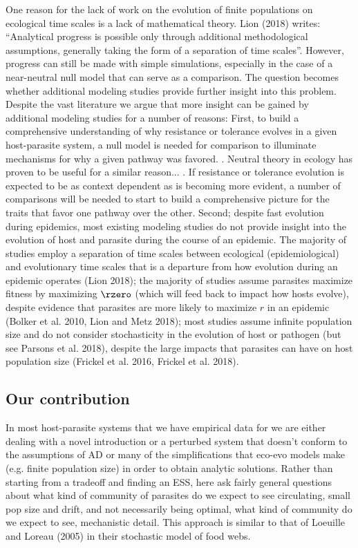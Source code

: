  One reason for the lack of work on the evolution of finite populations on ecological time scales is a lack of mathematical theory. Lion (2018) writes: ``Analytical progress is possible only through additional methodological assumptions, generally taking the form of a separation of time scales''. However, progress can still be made with simple simulations, especially in the case of a near-neutral null model that can serve as a comparison. The question becomes whether additional modeling studies provide further insight into this problem. Despite the vast literature we argue that more insight can be gained by additional modeling studies for a number of reasons: First, to build a comprehensive understanding of why resistance or tolerance evolves in a given host-parasite system, a null model is needed for comparison to illuminate mechanisms for why a given pathway was favored. . Neutral theory in ecology has proven to be useful for a similar reason... . If resistance or tolerance evolution is expected to be as context dependent as is becoming more evident, a number of comparisons will be needed to start to build a comprehensive picture for the traits that favor one pathway over the other. Second; despite fast evolution during epidemics, most existing modeling studies do not provide insight into the evolution of host and parasite during the course of an epidemic. The majority of studies employ a separation of time scales between ecological (epidemiological) and evolutionary time scales that is a departure from how evolution during an epidemic operates (Lion 2018); the majority of studies assume parasites maximize fitness by maximizing $\rzero$ (which will feed back to impact how hosts evolve), despite evidence that parasites are more likely to maximize $r$ in an epidemic (Bolker et al. 2010, Lion and Metz 2018); most studies assume infinite population size and do not consider stochasticity in the evolution of host or pathogen (but see Parsons et al. 2018), despite the large impacts that parasites can have on host population size (Frickel et al. 2016, Frickel et al. 2018).

\subsection*{Our contribution}

In most host-parasite systems that we have empirical data for we are either dealing with a novel introduction or a perturbed system that doesn't conform to the assumptions of AD or many of the simplifications that eco-evo models make (e.g. finite population size) in order to obtain analytic solutions. Rather than starting from a tradeoff and finding an ESS, here ask fairly general questions about what kind of community of parasites do we expect to see circulating, small pop size and drift, and not necessarily being optimal, what kind of community do we expect to see, mechanistic detail. This approach is similar to that of Loeuille and Loreau (2005) in their stochastic model of food webs. 

